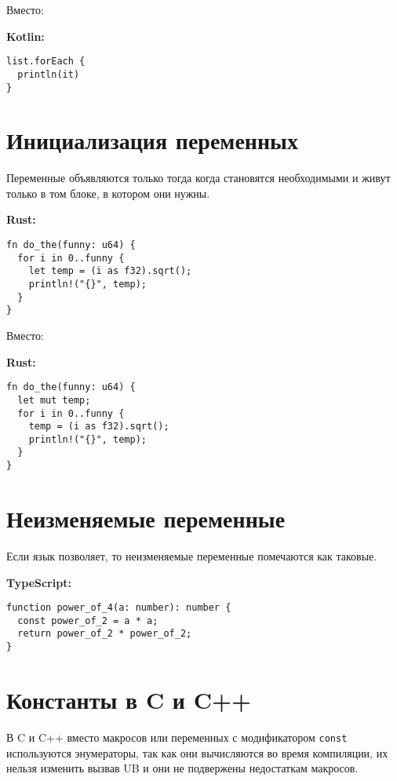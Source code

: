 \documentclass[12p]{article}
\begin{document}
Вместо:\newline

\textbf{Kotlin:}
\begin{verbatim}
list.forEach {
  println(it)
}
\end{verbatim}

\section{Инициализация переменных}

Переменные объявляются только тогда когда становятся необходимыми и живут только в том блоке, в котором они нужны.\newline

\textbf{Rust:}
\begin{verbatim}
fn do_the(funny: u64) {
  for i in 0..funny {
    let temp = (i as f32).sqrt();
    println!("{}", temp);
  }
}
\end{verbatim}

Вместо:\newline

\textbf{Rust:}
\begin{verbatim}
fn do_the(funny: u64) {
  let mut temp;
  for i in 0..funny {
    temp = (i as f32).sqrt();
    println!("{}", temp);
  }
}
\end{verbatim}

\section{Неизменяемые переменные}

Если язык позволяет, то неизменяемые переменные помечаются как таковые.\newline

\textbf{TypeScript:}
\begin{verbatim}
function power_of_4(a: number): number {
  const power_of_2 = a * a;
  return power_of_2 * power_of_2;
}
\end{verbatim}

\section{Константы в C и C++}

В C и C++ вместо макросов или переменных с модификатором \texttt{const} используются энумераторы, так как они вычисляются во время компиляции, их нельзя изменить вызвав UB и они не подвержены недостаткам макросов.\newline
\end{document}
